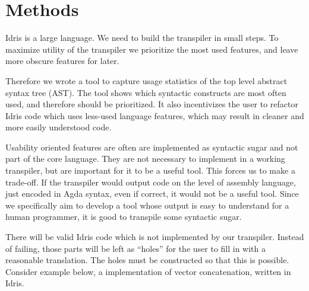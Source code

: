 \chapter{Methods}

Idris is a large language. We need to build the transpiler in small steps. To
maximize utility of the transpiler we prioritize the most used features,
and leave more obscure features for later.

Therefore we wrote a tool to capture usage statistics of the top level abstract
syntax tree (AST). The tool shows which syntactic constructs are most often
used, and therefore should be prioritized. It also incentivizes the user to refactor Idris code which uses less-used language features,
which may result in cleaner and more easily understood code.

Usability oriented features are often are implemented as syntactic sugar and
not part of the core language. They are not necessary to implement in a working
transpiler, but are important for it to be a useful tool. This forces us to make a trade-off.
If the transpiler would output code on the level of
assembly language, just encoded in Agda syntax, even if correct, it would not be a useful
tool. Since we specifically aim to develop a tool whose output is easy to
understand for a human programmer, it is good to transpile some syntactic sugar.



There will be valid Idris code which is not implemented by our transpiler.
Instead of failing, those parts will be left as ``holes'' for the user to fill in
with a reasonable translation.
The holes must be constructed so that this is possible.
Consider example below, a implementation of vector concatenation, written in
Idris.

